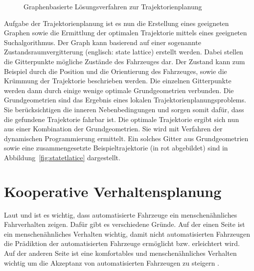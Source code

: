 \begin{figure}[!htbp]
    \centering
    \hfill
    \caption[Graphenbasierte Trajektorienplanung]{Graphenbasierte L\"osungsverfahren zur Trajektorienplanung}
    \label{fig:Graphenbasiert}
\end{figure}

Aufgabe der Trajektorienplanung ist es nun die Erstellung eines geeigneten Graphen sowie die Ermittlung der optimalen Trajektorie mittels eines geeigneten Suchalgorithmus.
Der Graph kann basierend auf einer sogenannte Zustandsraumvergitterung (englisch: state lattice) erstellt werden.
Dabei stellen die Gitterpunkte m\"ogliche Zust\"ande des Fahrzeuges dar.
Der Zustand kann zum Beispiel durch die Position und die Orientierung des Fahrzeuges, sowie die Kr\"ummung der Trajektorie beschrieben werden.
Die einzelnen Gitterpunkte werden dann durch einige wenige optimale Grundgeometrien verbunden. 
Die Grundgeometrien sind das Ergebnis eines lokalen Trajektorienplanungsproblems.
Sie ber\"ucksichtigen die inneren Nebenbedingungen und sorgen somit daf\"ur, dass die gefundene Trajektorie fahrbar ist.
Die optimale Trajektorie ergibt sich nun aus einer Kombination der Grundgeometrien.
Sie wird mit Verfahren der dynamischen Programmierung ermittelt. 
Ein solches Gitter aus Grundgeometrien sowie eine zusammengesetzte Beispieltrajektorie (in rot abgebildet) sind in Abbildung~\ref{fig:statetlatice} dargestellt.  \cite{Ziegler2009}



\section{Kooperative Verhaltensplanung}
Laut \cite{Naumann2017towards} und \cite{Lenz2016} ist es wichtig, dass automatisierte Fahrzeuge ein menschen\"ahnliches Fahrverhalten zeigen. 
Daf\"ur gibt es verschiedene Gr\"unde. 
Auf der einen Seite ist ein menschen\"ahnliches Verhalten wichtig, damit nicht automatisierten Fahrzeugen die Pr\"adiktion der automatisierten Fahrzeuge erm\"oglicht bzw. erleichtert wird. 
Auf der anderen Seite ist eine komfortables und menschen\"ahnliches Verhalten wichtig um die Akzeptanz von automatisierten Fahrzeugen zu steigern \cite{Naumann2017towards}. 

